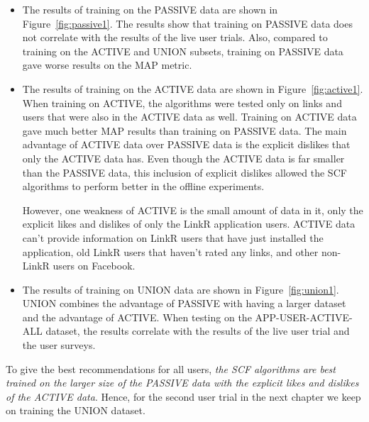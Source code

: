 \begin{itemize}
\item{The results of training on the PASSIVE data are shown in Figure~\ref{fig:passive1}. The results show that training on PASSIVE data does not correlate with the results of the live user trials. Also, compared to training on the ACTIVE and UNION subsets, training on PASSIVE data gave worse results on the MAP metric.}

\item{The results of training on the ACTIVE data are shown in Figure~\ref{fig:active1}. When training on ACTIVE, the algorithms were tested only on links and users that were also in the ACTIVE data as well. Training on ACTIVE data gave much better MAP results than training on PASSIVE data. The main advantage of ACTIVE data over PASSIVE data is the explicit dislikes that only the ACTIVE data has. Even though the ACTIVE data is far smaller than the PASSIVE data, this inclusion of explicit dislikes allowed the SCF algorithms to perform better in the offline experiments. 

However, one weakness of ACTIVE is the small amount of data in it, only the explicit likes and dislikes of only the LinkR application users. ACTIVE data can't provide information on LinkR users that have just installed the application, old LinkR users that haven't rated any links, and other non-LinkR users on Facebook.}

\item{The results of training on UNION data are shown in Figure~\ref{fig:union1}. UNION combines the advantage of PASSIVE with having a larger dataset and the advantage of ACTIVE. When testing on the APP-USER-ACTIVE-ALL dataset, the results correlate with the results of the live user trial and the user surveys.}
\end{itemize}

To give the best recommendations for all users, \emph{the SCF algorithms are best trained on the larger size of the PASSIVE data with the explicit likes and dislikes of the ACTIVE data}. Hence, for the second user trial in the next chapter we keep on training the UNION dataset.

